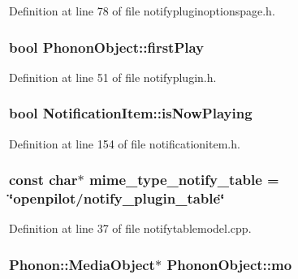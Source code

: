 \-Definition at line 78 of file notifypluginoptionspage.\-h.

\hypertarget{group___notify_plugin_ga86b5c4ceede5297e656149cd1f1af3fe}{
\subsubsection[{first\-Play}]{\setlength{\rightskip}{0pt plus 5cm}bool {\bf \-Phonon\-Object\-::first\-Play}}}\label{group___notify_plugin_ga86b5c4ceede5297e656149cd1f1af3fe}


\-Definition at line 51 of file notifyplugin.\-h.

\hypertarget{group___notify_plugin_gabd9ee81e318805b60e89e7045eb7deaa}{
\subsubsection[{is\-Now\-Playing}]{\setlength{\rightskip}{0pt plus 5cm}bool {\bf \-Notification\-Item\-::is\-Now\-Playing}}}\label{group___notify_plugin_gabd9ee81e318805b60e89e7045eb7deaa}


\-Definition at line 154 of file notificationitem.\-h.

\hypertarget{group___notify_plugin_ga326ccffe8d16a6f14d44c2048dea58a7}{
\subsubsection[{mime\-\_\-type\-\_\-notify\-\_\-table}]{\setlength{\rightskip}{0pt plus 5cm}const char$\ast$ {\bf mime\-\_\-type\-\_\-notify\-\_\-table} = \char`\"{}openpilot/notify\-\_\-plugin\-\_\-table\char`\"{}}}\label{group___notify_plugin_ga326ccffe8d16a6f14d44c2048dea58a7}


\-Definition at line 37 of file notifytablemodel.\-cpp.

\hypertarget{group___notify_plugin_ga3b35d975a7599cd263b275559734e54d}{
\subsubsection[{mo}]{\setlength{\rightskip}{0pt plus 5cm}\-Phonon\-::\-Media\-Object$\ast$ {\bf \-Phonon\-Object\-::mo}}}\label{group___notify_plugin_ga3b35d975a7599cd263b275559734e54d}


